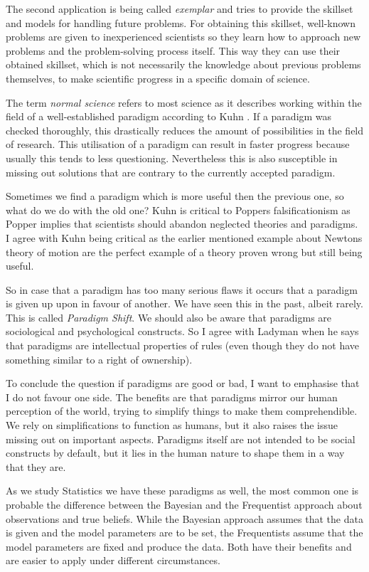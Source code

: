 \documentclass[11pt]{scrartcl}
\begin{document}
The second application is being called \textit{exemplar} and tries to provide the skillset and models for handling future problems. For obtaining this skillset, well-known problems are given to  inexperienced scientists so they learn how to approach new problems  and the problem-solving process itself. This way they can use their obtained skillset, which is not necessarily the knowledge about  previous problems themselves, to make scientific progress in a specific domain of science.

The term \textit{normal science} refers to most science as it describes working within the field of a well-established paradigm according to Kuhn \cite[p. 100]{ladyman}. If a paradigm was checked thoroughly, this drastically reduces the amount of possibilities in the field of research. This utilisation of a paradigm can result in faster progress because usually this tends to less questioning. Nevertheless this is also susceptible in missing out solutions that are contrary to the currently accepted paradigm.

Sometimes we find a paradigm which is more useful then the previous one, so what do we do with the old one? Kuhn is critical to Poppers falsificationism \cite[p. 101]{ladyman} as Popper implies that scientists should abandon neglected theories and paradigms. I agree with Kuhn being critical as the earlier mentioned example about Newtons theory of motion are the perfect example of a theory proven wrong but still being useful.

So in case that a paradigm has too many serious flaws it occurs that a paradigm is given up upon in favour of another. We have seen this in the past, albeit rarely. This is called \textit{Paradigm Shift}. We should also be aware that paradigms are sociological and psychological constructs. So I agree with Ladyman when he says that paradigms are intellectual properties of rules (even though they do not have something similar to a right of ownership).

To conclude the question if paradigms are good or bad, I want to emphasise that I do not favour one side. The benefits are that paradigms mirror our human perception of the world, trying to simplify things to make them comprehendible. We rely on simplifications to function as humans, but it also raises the issue missing out on important aspects. Paradigms itself are not intended to be social constructs by default, but it lies in the human nature to shape them in a way that they are.

As we study Statistics we have these paradigms as well, the most common one is probable the difference between the Bayesian and the Frequentist approach about observations and true beliefs. While the Bayesian approach assumes that the data is given and the model parameters are to be set, the Frequentists assume that the model parameters are fixed and produce the data. Both have their benefits and are easier to apply under different circumstances.
\end{document}
